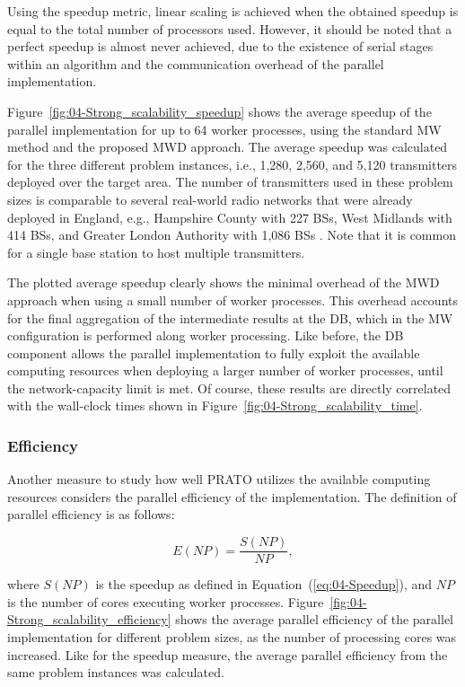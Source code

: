 Using the speedup metric, linear scaling is achieved when the obtained
speedup is equal to the total number of processors used. However,
it should be noted that a perfect speedup is almost never achieved,
due to the existence of serial stages within an algorithm and the
communication overhead of the parallel implementation.

Figure~\ref{fig:04-Strong_scalability_speedup} shows the average
speedup of the parallel implementation for up to 64 worker processes,
using the standard MW method and the proposed MWD approach. The average
speedup was calculated for the three different problem instances,
i.e., 1,280, 2,560, and 5,120 transmitters deployed over the target
area. The number of transmitters used in these problem sizes is comparable
to several real-world radio networks that were already deployed in
England, e.g., Hampshire County with 227 BSs, West Midlands with 414
BSs, and Greater London Authority with 1,086 BSs \cite{Number_of_base_stations_in_England}.
Note that it is common for a single base station to host multiple
transmitters. 

The plotted average speedup clearly shows the minimal overhead of
the MWD approach when using a small number of worker processes. This
overhead accounts for the final aggregation of the intermediate results
at the DB, which in the MW configuration is performed along worker
processing. Like before, the DB component allows the parallel implementation
to fully exploit the available computing resources when deploying
a larger number of worker processes, until the network-capacity limit
is met. Of course, these results are directly correlated with the
wall-clock times shown in Figure~\ref{fig:04-Strong_scalability_time}.


\subsubsection{Efficiency}

Another measure to study how well PRATO utilizes the available computing
resources considers the parallel efficiency of the implementation.
The definition of parallel efficiency is as follows:

\begin{equation}
E(NP)=\frac{S(NP)}{NP},
\end{equation}


\noindent where $S(NP)$ is the speedup as defined in Equation~(\ref{eq:04-Speedup}),
and $NP$ is the number of cores executing worker processes. Figure~\ref{fig:04-Strong_scalability_efficiency}
shows the average parallel efficiency of the parallel implementation
for different problem sizes, as the number of processing cores was
increased. Like for the speedup measure, the average parallel efficiency
from the same problem instances was calculated.

